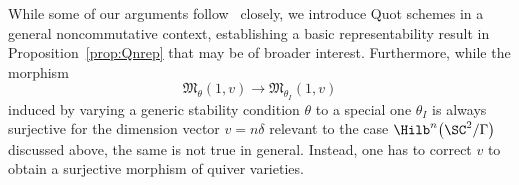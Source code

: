 While some of our
arguments follow~\cite{craw2019punctual} closely,
we introduce
Quot schemes in a general noncommutative
context, establishing a basic representability result in Proposition~\ref{prop:Qnrep} that may be of broader interest. Furthermore, while the
morphism
\[ \mathfrak{M}_\theta(1,v) \longrightarrow \mathfrak{M}_{\theta_I}(1,v) \]
induced by varying a generic stability condition $\theta$ to a special one $\theta_I$ is always surjective for the
dimension vector $v=n\delta$ relevant to the case $\Hilb^n\big(\SC^2/\Gamma\big)$ discussed above,
the same is not true in general.
Instead, one has to correct $v$ to
obtain a surjective morphism of quiver varieties.
